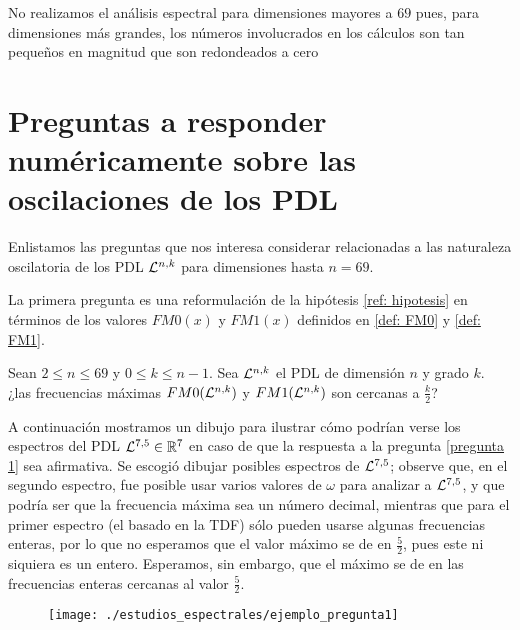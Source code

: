 No realizamos el análisis espectral para dimensiones
mayores a $69$ pues, para dimensiones más grandes, los números
involucrados en los cálculos son tan pequeños
en magnitud que son redondeados a cero


\section{Preguntas a responder numéricamente sobre las oscilaciones de los PDL}

Enlistamos las preguntas que nos interesa considerar
relacionadas a las naturaleza oscilatoria
de los PDL $\mathcal{L}^{n,k}$
para dimensiones hasta $n=69$. 

La primera pregunta es una reformulación de la 
hipótesis \ref{ref: hipotesis} en términos de los 
valores $FM0(x)$ y $FM1(x)$ definidos en 
\ref{def: FM0} y \ref{def: FM1}.

\begin{pregunta}
\label{pregunta 1}
Sean $2 \leq n \leq 69$ y $0 \leq k \leq n-1$.
Sea $\mathcal{L}^{n,k}$ el PDL de dimensión $n$ y grado $k$.
¿las frecuencias máximas
$FM0(\mathcal{L}^{n,k})$ y 
$FM1(\mathcal{L}^{n,k})$ son cercanas a $\frac{k}{2}$?
\end{pregunta}

A continuación mostramos un dibujo para
ilustrar cómo podrían verse los
espectros del PDL
$\mathcal{L}^{7,5} \in \mathbb{R}^{7}$
en caso de que la respuesta a la pregunta
\ref{pregunta 1} sea afirmativa.
Se escogió dibujar posibles espectros
de $\mathcal{L}^{7,5}$; observe que, en el segundo espectro,
fue posible usar varios valores de $\omega$ para analizar
a $\mathcal{L}^{7,5}$, y que podría ser que la frecuencia máxima
sea un número decimal, mientras que para el primer espectro
(el basado en la TDF) sólo pueden usarse algunas frecuencias
enteras, por lo que no esperamos que el valor máximo
se de en $\frac{5}{2}$, pues este ni siquiera es un entero.
Esperamos, sin embargo, que el máximo se de en las frecuencias
enteras cercanas al valor $\frac{5}{2}$.

\begin{figure}[H]
	\centering
	\texttt{[image: ./estudios\_espectrales/ejemplo\_pregunta1]} 
\end{figure}	

